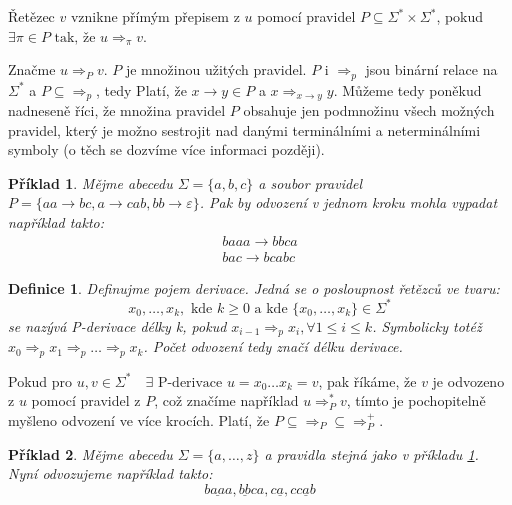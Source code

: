 \documentclass[10pt,a4paper]{article}
\theoremstyle{note}
\newtheorem{definice}{Definice}
\newtheorem{priklad}{Příklad}
\begin{document}
Řetězec $v$ vznikne přímým přepisem z $u$ pomocí pravidel $P \subseteq  \Sigma^{*} \times \Sigma^{*}$, pokud
$\exists \pi \in P \text{ tak, že } u \Rightarrow_{\pi} v$.

Značme $u \Rightarrow_{P} v$. $P$ je množinou užitých pravidel. $P$ i $\Rightarrow_{p}$ jsou binární relace na $\Sigma^{*}$ a
$P \subseteq  \Rightarrow_{p}$, tedy  Platí, že $x \rightarrow y \in P$ a $x \Rightarrow_{x \rightarrow y} y$.
Můžeme tedy poněkud nadneseně říci, že množina pravidel $P$ obsahuje jen podmnožinu všech možných pravidel, který je možno sestrojit
nad danými terminálními a neterminálními symboly (o těch se dozvíme více informaci později).

\begin{priklad}
Mějme abecedu $\Sigma = \lbrace a, b, c \rbrace$ a soubor pravidel $P = \lbrace aa \rightarrow bc, a \rightarrow cab, bb \rightarrow \varepsilon \rbrace$\label{priklad-1}.
Pak by odvození v jednom kroku mohla vypadat například takto:
\begin{gather*}
baaa \rightarrow bbca \\
bac \rightarrow bcabc
\end{gather*}
\end{priklad}

\begin{definice}
Definujme pojem \textit{derivace}. Jedná se o posloupnost řetězců ve tvaru:
$$
x_{0}, \ldots, x_{k},\text{ kde } k \geq 0\text{ a kde } \lbrace x_{0}, \ldots, x_{k} \rbrace \in \Sigma^{*}
$$
se nazývá \textit{P-derivace délky k}, pokud $x_{i-1} \Rightarrow_{p} x_{i}, \forall 1 \leq i \leq k $.
Symbolicky totéž $x_{0} \Rightarrow_{p} x_{1} \Rightarrow_{p} \ldots \Rightarrow_{p} x_{k}$. Počet odvození tedy značí \textit{délku} derivace.
\end{definice}

Pokud pro $u, v \in \Sigma^{*} \quad \exists \text{ P-derivace } u = x_{0} \ldots x_{k} = v$, pak říkáme, že $v$ je odvozeno z $u$ pomocí pravidel z $P$, což značíme
například $u \Rightarrow_{P}^{*} v$, tímto je pochopitelně myšleno odvození ve více krocích. Platí, že $P \subseteq \Rightarrow_{P} \subseteq \Rightarrow_{P}^{+}$.

\begin{priklad}
Mějme abecedu $\Sigma = \lbrace a, \ldots, z \rbrace$ a pravidla stejná jako v příkladu \ref{priklad-1}.
Nyní odvozujeme například takto:
$$
b\underline{aa}a, \underline{bb}ca, c\underline{a}, c\underline{cab}
$$
\end{priklad}
\end{document}
